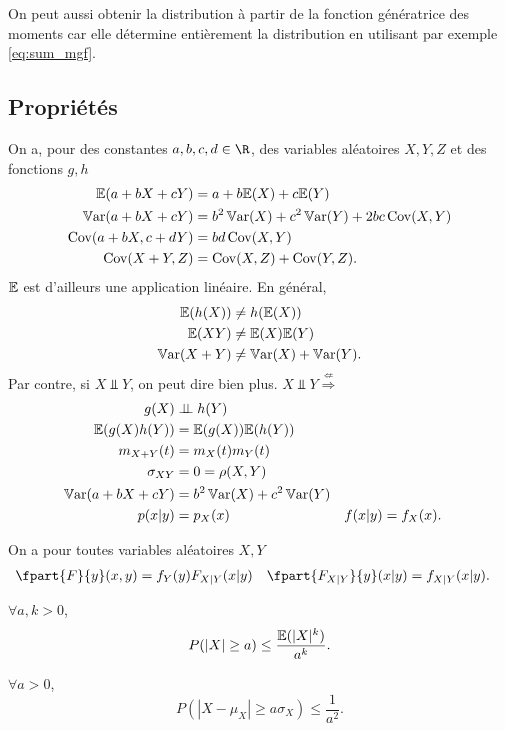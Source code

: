 On peut aussi obtenir la distribution à partir de la fonction génératrice des moments car
elle détermine entièrement la distribution en utilisant par exemple \eqref{eq:sum_mgf}.

\subsection{Propriétés}
On a, pour des constantes $a, b, c, d \in \R$, des variables aléatoires $X, Y, Z$ et des fonctions $g, h$
\begin{align*}
  \mathbb{E}(a + bX + cY) & = a + b\mathbb{E}(X) + c\mathbb{E}(Y)\\
  \operatorname{\mathbb{V}ar}(a + bX + cY) & = b^2\operatorname{\mathbb{V}ar}(X) + c^2\operatorname{\mathbb{V}ar}(Y) + 2bc\operatorname{Cov}(X,Y)\\
  \operatorname{Cov}(a + bX, c + dY) & = bd \operatorname{Cov}(X, Y)\\
  \operatorname{Cov}(X + Y, Z) & = \operatorname{Cov}(X, Z) + \operatorname{Cov}(Y, Z).
\end{align*}
$\mathbb{E}$ est d'ailleurs une application linéaire.
En général,
\begin{align*}
  \mathbb{E}(h(X)) & \neq h(\mathbb{E}(X))\\
  \mathbb{E}(XY) & \neq \mathbb{E}(X) \mathbb{E}(Y)\\
  \operatorname{\mathbb{V}ar}(X + Y) & \neq \operatorname{\mathbb{V}ar}(X) + \operatorname{\mathbb{V}ar}(Y).
\end{align*}
Par contre, si $X \Perp Y$, on peut dire bien plus.
$X \Perp Y \stackrel{\nLeftarrow}{\Rightarrow}$
\begin{align}
  g(X) & \perp\!\!\!\perp h(Y)\\
  \mathbb{E}(g(X)h(Y)) & = \mathbb{E}(g(X)) \mathbb{E}(h(Y))\\
  \label{eq:sum_mgf}
  m_{X + Y}(t) & = m_X(t) m_Y(t)\\
  \sigma_{XY} & = 0 = \rho(X, Y)\\
  \operatorname{\mathbb{V}ar}(a + bX + cY) & = b^2\operatorname{\mathbb{V}ar}(X) + c^2\operatorname{\mathbb{V}ar}(Y)\\
  p(x | y) & = p_X(x) & f(x | y) & = f_X(x).
\end{align}

On a pour toutes variables aléatoires $X, Y$
\begin{align*}
  \fpart{F}{y}(x,y) & = f_Y(y) F_{X|Y}(x|y) & \fpart{F_{X|Y}}{y}(x|y) & = f_{X|Y}(x|y).
\end{align*}

\begin{myineg}[Markov]
  $\forall a, k > 0$,
  \[ P(|X| \geq a) \leq \frac{\mathbb{E}(|X|^k)}{a^k}. \]
\end{myineg}

\begin{myineg}[Chebyshev]
  $\forall a > 0$,
  \[ P(|X - \mu_X| \geq a\sigma_X) \leq \frac{1}{a^2}. \]
\end{myineg}

